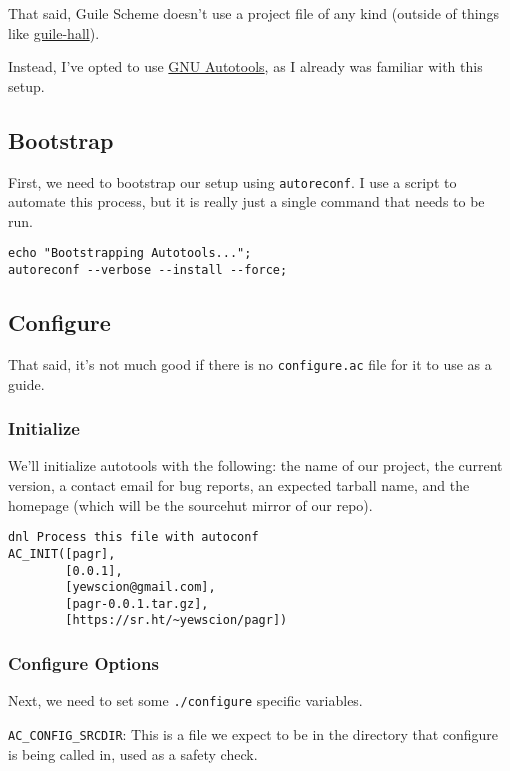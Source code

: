 \documentclass[11pt]{article}
\begin{document}
That said, Guile Scheme doesn't use a project file of any kind (outside of
things like \href{https://gitlab.com/a-sassmannshausen/guile-hall}{guile-hall}).

Instead, I've opted to use \href{https://www.gnu.org/software/automake/faq/autotools-faq.html}{GNU Autotools}, as I already was familiar with this
setup.

\subsection{Bootstrap}
\label{sec:orge7749ce}
First, we need to bootstrap our setup using \texttt{autoreconf}. I use a script to
automate this process, but it is really just a single command that needs to be
run.

\begin{verbatim}
echo "Bootstrapping Autotools...";
autoreconf --verbose --install --force;
\end{verbatim}

\subsection{Configure}
\label{sec:orgb16a723}
That said, it's not much good if there is no \texttt{configure.ac} file for it to use
as a guide.

\subsubsection{Initialize}
\label{sec:org6215320}

We'll initialize autotools with the following: the name of our project, the
current version, a contact email for bug reports, an expected tarball name, and
the homepage (which will be the sourcehut mirror of our repo).

\begin{verbatim}
dnl Process this file with autoconf
AC_INIT([pagr],
        [0.0.1],
        [yewscion@gmail.com],
        [pagr-0.0.1.tar.gz],
        [https://sr.ht/~yewscion/pagr])
\end{verbatim}

\subsubsection{Configure Options}
\label{sec:org321afe1}
Next, we need to set some \texttt{./configure} specific variables.

\texttt{AC\_CONFIG\_SRCDIR}: This is a file we expect to be in the directory that
configure is being called in, used as a safety check.
\end{document}
